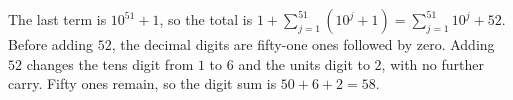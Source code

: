 The last term is $10^{51}+1$, so the total is $1+\sum_{j=1}^{51}(10^j+1)=\sum_{j=1}^{51}10^j+52$. Before adding $52$, the decimal digits are fifty-one ones followed by zero. Adding $52$ changes the tens digit from $1$ to $6$ and the units digit to $2$, with no further carry. Fifty ones remain, so the digit sum is $\boxed{50+6+2=58}$.
